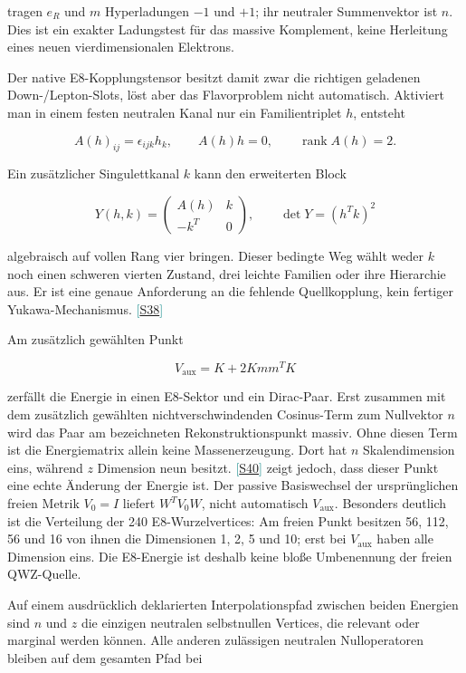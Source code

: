 \documentclass[11pt,a4paper,oneside,parskip=half,headings=normal,numbers=noenddot,bibliography=totoc]{scrreprt}
\newcommand{\src}[1]{\textcolor{teal}{\small[\hyperref[s:#1]{S#1}]}}
\begin{document}
tragen \(e_R\) und \(m\) Hyperladungen \(-1\) und \(+1\); ihr neutraler Summenvektor ist \(n\). Dies ist ein exakter Ladungstest für das massive Komplement, keine Herleitung eines neuen vierdimensionalen Elektrons.

Der native E8-Kopplungstensor besitzt damit zwar die richtigen geladenen Down-/Lepton-Slots, löst aber das Flavorproblem nicht automatisch. Aktiviert man in einem festen neutralen Kanal nur ein Familientriplet \(h\), entsteht

\[
A(h)_{ij}=\epsilon_{ijk}h_k,\qquad A(h)h=0,
\qquad \operatorname{rank}A(h)=2.
\]

Ein zusätzlicher Singulettkanal \(k\) kann den erweiterten Block

\[
Y(h,k)=\begin{pmatrix}A(h)&k\\-k^T&0\end{pmatrix},
\qquad \det Y=(h^Tk)^2
\]

algebraisch auf vollen Rang vier bringen. Dieser bedingte Weg wählt weder \(k\) noch einen schweren vierten Zustand, drei leichte Familien oder ihre Hierarchie aus. Er ist eine genaue Anforderung an die fehlende Quellkopplung, kein fertiger Yukawa-Mechanismus. \src{38}

Am zusätzlich gewählten Punkt

\[
V_\mathrm{aux}=K+2Kmm^TK
\]

zerfällt die Energie in einen E8-Sektor und ein Dirac-Paar. Erst zusammen mit dem zusätzlich gewählten nichtverschwindenden Cosinus-Term zum Nullvektor $n$ wird das Paar am bezeichneten Rekonstruktionspunkt massiv. Ohne diesen Term ist die Energiematrix allein keine Massenerzeugung. Dort hat \(n\) Skalendimension eins, während \(z\) Dimension neun besitzt. \src{40} zeigt jedoch, dass dieser Punkt eine echte Änderung der Energie ist. Der passive Basiswechsel der ursprünglichen freien Metrik \(V_0=I\) liefert \(W^TV_0W\), nicht automatisch \(V_\mathrm{aux}\). Besonders deutlich ist die Verteilung der 240 E8-Wurzelvertices: Am freien Punkt besitzen 56, 112, 56 und 16 von ihnen die Dimensionen 1, 2, 5 und 10; erst bei \(V_\mathrm{aux}\) haben alle Dimension eins. Die E8-Energie ist deshalb keine bloße Umbenennung der freien QWZ-Quelle.

Auf einem ausdrücklich deklarierten Interpolationspfad zwischen beiden Energien sind \(n\) und \(z\) die einzigen neutralen selbstnullen Vertices, die relevant oder marginal werden können. Alle anderen zulässigen neutralen Nulloperatoren bleiben auf dem gesamten Pfad bei
\end{document}
